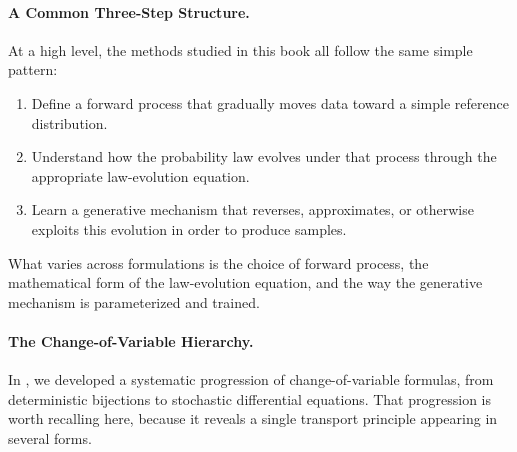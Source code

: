 \paragraph{A Common Three-Step Structure.}
At a high level, the methods studied in this book all follow the same simple pattern:
\begin{enumerate}[leftmargin=2em]
    \item Define a forward process that gradually moves data toward a simple reference distribution.
    \item Understand how the probability law evolves under that process through the appropriate law-evolution equation.
    \item Learn a generative mechanism that reverses, approximates, or otherwise exploits this evolution in order to produce samples.
\end{enumerate}
What varies across formulations is the choice of forward process, the mathematical form of the law-evolution equation, and the way the generative mechanism is parameterized and trained.

\paragraph{The Change-of-Variable Hierarchy.}
In , we developed a systematic progression of change-of-variable formulas, from deterministic bijections to stochastic differential equations. That progression is worth recalling here, because it reveals a single transport principle appearing in several forms.

\FloatBarrier %

